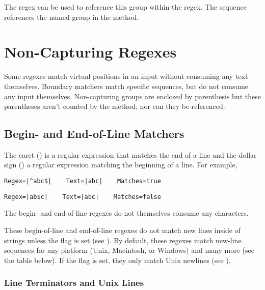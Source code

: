 The regex  can be used to reference this group within the regex.
The sequence  references the named group in the  method.


\section{Non-Capturing Regexes}\label{section:non-capturing-regex}

Some regexes match virtual positions in an input without consuming any
text themselves.  
Boundary matchers match specific sequences, but do not consume any
input themselves.  
Non-capturing groups are enclosed by parenthesis but these parentheses
aren't counted by the  method, nor can they
be referenced.


\subsection{Begin- and End-of-Line Matchers}

The caret (\code{\^{}}) is a regular expression that matches the end
of a line and the dollar sign (\code{\$}) a regular expression
matching the beginning of a line.  For example, 
%
\begin{verbatim}
Regex=|^abc$|    Text=|abc|    Matches=true
\end{verbatim}
%
\begin{verbatim}
Regex=|ab$c|    Text=|abc|    Matches=false
\end{verbatim}
%
The begin- and end-of-line regexes do not themselves consume any
characters.

These begin-of-line and end-of-line regexes do not match new lines
inside of strings unless the  flag is set (see
).  By default, these regexes match new-line
sequences for any platform (Unix, Macintosh, or Windows) and many more
(see the table below).  If
the
 flag is set, they only match Unix newlines (see
).

\subsubsection{Line Terminators and Unix Lines}\label{section:regex-lines}

